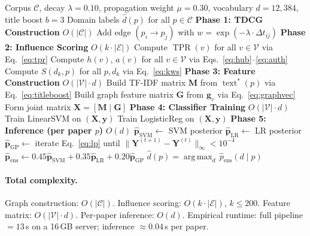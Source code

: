 \documentclass[letterpaper]{article}
\theoremstyle{plain}
\theoremstyle{definition}
\theoremstyle{remark}
\newcommand{\V}{\mathcal{V}}
\newcommand{\E}{\mathcal{E}}
\newcommand{\C}{\mathcal{C}}
\newcommand{\X}{\mathbf{X}}
\newcommand{\M}{\mathbf{M}}
\newcommand{\Gmat}{\mathbf{G}}
\newcommand{\Y}{\mathbf{Y}}
\newcommand{\R}{\mathbb{R}}
\newcommand{\lam}{\lambda}
\newcommand{\yd}[1]{\operatorname{year}(#1)}
\newcommand{\dt}{\Delta t}
\newcommand{\tpr}[1]{\operatorname{TPR}(#1)}
\newcommand{\hub}[1]{h(#1)}
\newcommand{\auth}[1]{a(#1)}
\DeclareMathOperator*{\argmax}{arg\,max}
\begin{document}
\begin{algorithm}[h]
\caption{TDCG-AT Classification Pipeline}
\label{alg:tdcgat}
\begin{algorithmic}[1]
\Require Corpus $\C$, decay $\lam{=}0.10$,
         propagation weight $\mu{=}0.30$,
         vocabulary $d{=}12{,}384$,
         title boost $b{=}3$
\Ensure  Domain labels $\hat{d}(p)$ for all $p \in \C$
\Statex
\textbf{Phase 1: TDCG Construction} \hfill $O(|\C|)$
    \If{$\yd{p_i} > \yd{p_j}$} 
        \State Add edge $(p_i \to p_j)$ with
               $w = \exp(-\lam \cdot \dt_{ij})$ 
    \EndIf
\EndFor
\Statex
\textbf{Phase 2: Influence Scoring} \hfill $O(k \cdot |\E|)$
\State Compute $\tpr{v}$ for all $v \in \V$ via
       Eq.~\eqref{eq:tpr} 
\State Compute $\hub{v}$, $\auth{v}$ for all $v \in \V$
       via Eqs.~\eqref{eq:hub}--\eqref{eq:auth}
\State Compute $S(d_k, p)$ for all $p, d_k$
       via Eq.~\eqref{eq:kws}
\Statex
\textbf{Phase 3: Feature Construction} \hfill $O(|\V| \cdot d)$
\State Build TF-IDF matrix $\M$ from $\operatorname{text}^*(p)$
       via Eq.~\eqref{eq:titleboost}
\State Build graph feature matrix $\Gmat$ from $\mathbf{g}_v$
       via Eq.~\eqref{eq:graphvec}
\State Form joint matrix $\X = [\M \mid \Gmat]$
       \Comment{Eq.~\eqref{eq:featurematrix},
       $\X \in \R^{1489 \times 12397}$}
\Statex
\textbf{Phase 4: Classifier Training} \hfill $O(|\V| \cdot d)$
\State Train LinearSVM on $(\X, \mathbf{y})$ 
\State Train LogisticReg on $(\X, \mathbf{y})$ 
\Statex
\textbf{Phase 5: Inference (per paper $p$)} \hfill $O(d)$
\State $\hat{\mathbf{p}}_{\mathrm{SVM}} \gets$ SVM posterior
\State $\hat{\mathbf{p}}_{\mathrm{LR}} \gets$ LR posterior
\State $\hat{\mathbf{p}}_{\mathrm{GP}} \gets$
       iterate Eq.~\eqref{eq:lp} until
       $\|\Y^{(t+1)}-\Y^{(t)}\|_\infty < 10^{-4}$
\State $\hat{\mathbf{p}}_{\mathrm{ens}} \gets
       0.45\hat{\mathbf{p}}_{\mathrm{SVM}}
       + 0.35\hat{\mathbf{p}}_{\mathrm{LR}}
       + 0.20\hat{\mathbf{p}}_{\mathrm{GP}}$
\State \Return $\hat{d}(p) = \argmax_d\, \hat{p}_{\mathrm{ens}}(d \mid p)$
\end{algorithmic}
\end{algorithm}

\paragraph{Total complexity.}
Graph construction: $O(|\C|)$.
Influence scoring: $O(k \cdot |\E|)$, $k \leq 200$.
Feature matrix: $O(|\V| \cdot d)$.
Per-paper inference: $O(d)$.
Empirical runtime: full pipeline $= 13$\,s on a 16\,GB server;
inference $\approx 0.04$\,s per paper.
\end{document}
